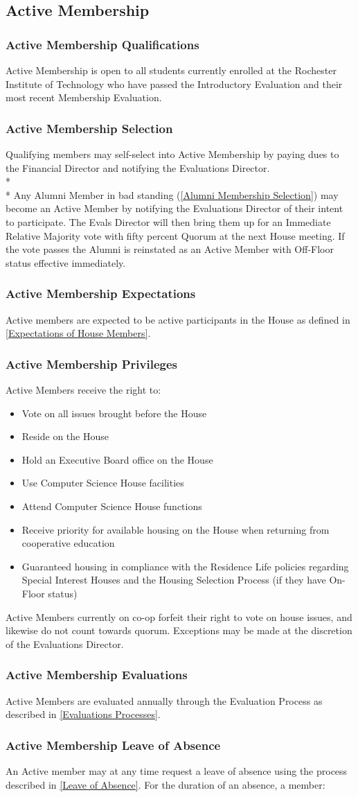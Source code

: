 \documentclass{article}
\newcommand{\asection}[1]{\subsection{#1} \label{#1}}
\newcommand{\asubsection}[1]{\subsubsection{#1} \label{#1}}
\begin{document}
\asection{Active Membership}
\asubsection{Active Membership Qualifications}
Active Membership is open to all students currently enrolled at the Rochester Institute of Technology who have passed the Introductory Evaluation and their most recent Membership Evaluation.
\asubsection{Active Membership Selection}
Qualifying members may self-select into Active Membership by paying dues to the Financial Director and notifying the Evaluations Director.
\\*\\*
Any Alumni Member in bad standing (\ref{Alumni Membership Selection}) may become an Active Member by notifying the Evaluations Director of their intent to participate.
The Evals Director will then bring them up for an Immediate Relative Majority vote with fifty percent Quorum at the next House meeting.
If the vote passes the Alumni is reinstated as an Active Member with Off-Floor status effective immediately.
\asubsection{Active Membership Expectations}
Active members are expected to be active participants in the House as defined in \ref{Expectations of House Members}.
\asubsection{Active Membership Privileges}
Active Members receive the right to:
\begin{itemize}
	\item Vote on all issues brought before the House
	\item Reside on the House
	\item Hold an Executive Board office on the House
	\item Use Computer Science House facilities
	\item Attend Computer Science House functions
	\item Receive priority for available housing on the House when returning from cooperative education
	\item Guaranteed housing in compliance with the Residence Life policies regarding Special Interest Houses and the Housing Selection Process (if they have On-Floor status)
\end{itemize}
Active Members currently on co-op forfeit their right to vote on house issues, and likewise do not count towards quorum.
Exceptions may be made at the discretion of the Evaluations Director.
\asubsection{Active Membership Evaluations}
Active Members are evaluated annually through the Evaluation Process as described in \ref{Evaluations Processes}.
\asubsection{Active Membership Leave of Absence}
An Active member may at any time request a leave of absence using the process described in \ref{Leave of Absence}.
For the duration of an absence, a member:
\end{document}
